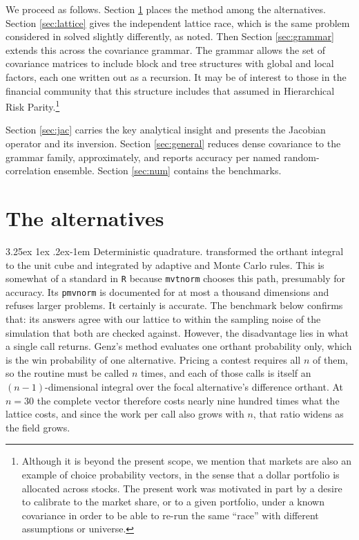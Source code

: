 \documentclass[11pt]{article}
\makeatletter
\renewcommand\paragraph{\@startsection{paragraph}{4}{\z@}%
  {3.25ex \@plus1ex \@minus.2ex}{-1em}%
  {\normalfont\normalsize\itshape}}
\makeatother
\begin{document}
We proceed as follows. Section \ref{sec:alternatives} places the method among the alternatives.
Section \ref{sec:lattice} gives the independent lattice race, which is the same problem considered in \citet{cotton2021} solved slightly differently, as noted. Then Section
\ref{sec:grammar} extends this across the covariance grammar. The grammar allows the set of covariance matrices to include block and tree structures with global and local factors, each one written out as a recursion. It may be of interest to those in the financial community that this structure includes that assumed in Hierarchical Risk Parity.\footnote{Although it is beyond the present scope, we mention that markets are also an example of choice probability vectors, in the sense that a dollar portfolio is allocated across stocks. The present work was motivated in part by a desire to calibrate to the market share, or to a given portfolio, under a known covariance in order to be able to re-run the same ``race'' with different assumptions or universe.}

Section \ref{sec:jac} carries the key analytical insight and presents
the Jacobian operator and its inversion. Section \ref{sec:general} reduces
dense covariance to the grammar family, approximately, and reports accuracy
per named random-correlation ensemble. Section \ref{sec:num} contains the
benchmarks.

\section{The alternatives}\label{sec:alternatives}

\paragraph{Deterministic quadrature.} \citet{genz1992} transformed the orthant
integral to the unit cube and integrated by adaptive and Monte Carlo rules.
This is somewhat of a standard in \texttt{R} because \texttt{mvtnorm} chooses this path, presumably for accuracy. Its \texttt{pmvnorm} is documented for at most a thousand dimensions and refuses larger problems. It certainly is accurate. The benchmark below confirms that: its answers agree with our lattice to within the sampling noise of the simulation that both are checked against. However, the disadvantage lies in what a single call returns. Genz's method evaluates one orthant probability only, which is the win probability of one alternative. Pricing a contest
requires all $n$ of them, so the routine must be called $n$ times, and each of
those calls is itself an $(n-1)$-dimensional integral over the focal
alternative's difference orthant. At $n=30$ the complete vector therefore
costs nearly nine hundred times what the lattice costs, and since the work per
call also grows with $n$, that ratio widens as the field grows.
\end{document}
